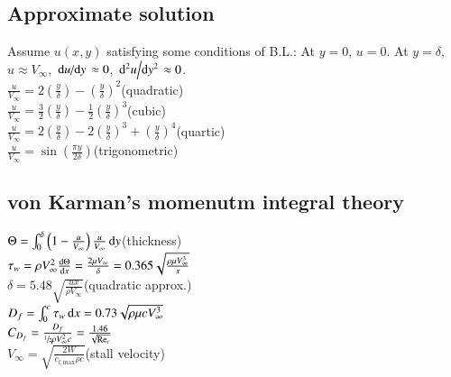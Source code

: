 \subsection*{Approximate solution}
Assume $u(x,y)$ satisfying some conditions of B.L.: At $y=0$, $u=0$. At $y=\delta$, $u\approx V_\infty$, $\odv{u}/{y}\approx0$, $\odv[order=2]{u}/{y}\approx0$.\\
$\frac{u}{V_\infty}=2\left(\frac{y}{\delta}\right)-\left(\frac{y}{\delta}\right)^2$\hfill(quadratic)\\
$\frac{u}{V_\infty}=\frac{3}{2}\left(\frac{y}{\delta}\right)-\frac{1}{2}\left(\frac{y}{\delta}\right)^3$\hfill (cubic)\\
$\frac{u}{V_\infty}=2\left(\frac{y}{\delta}\right)-2\left(\frac{y}{\delta}\right)^3+\left(\frac{y}{\delta}\right)^4$\hfill (quartic)\\
$\frac{u}{V_\infty}=\sin\left(\frac{\pi y}{2\delta}\right)$\hfill(trigonometric)
\subsection*{von Karman's momenutm integral theory}
$\Theta=\int_0^\delta\left(1-\frac{u}{V_\infty}\right)\frac{u}{V_\infty}\odif{y}$\hfill(thickness)\\
$\tau_w=\rho V_\infty^2\odv{\Theta}{x}=\frac{2\mu V_\infty}{\delta}=0.365\sqrt{\frac{\rho\mu V_\infty^3}{x}}$\\
$\delta=5.48\sqrt{\frac{ux}{\rho V_\infty}}$\hfill(quadratic approx.)\\
$D_f=\int_0^c\tau_w\odif{x}=0.73\sqrt{\rho\mu cV_\infty^3}$\\
$C_{D_f}=\frac{D_f}{\sfrac{1}{2}\rho V_\infty^2c}=\frac{1.46}{\sqrt{\text{Re}_c}}$\\
$V_\infty=\sqrt{\frac{2W}{c_{l,\text{max}}\rho c }}$\hfill(stall velocity)
